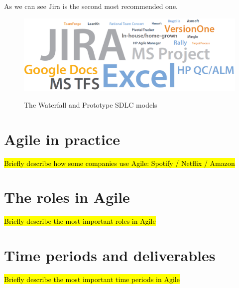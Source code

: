 	As we can see Jira is the second most recommended one.

	\begin{figure}[H]
		\centering
		\includegraphics[width=.8\textwidth]{resources/Untitled_4}\\
		\caption{The Waterfall and Prototype SDLC models}
	\end{figure}

\section{Agile in practice}
\hl{Briefly describe how some companies use Agile: Spotify / Netflix / Amazon}






\section{The roles in Agile}
\hl{Briefly describe the most important roles in Agile}

\section{Time periods and deliverables}
\hl{Briefly describe the most important time periods in Agile}

